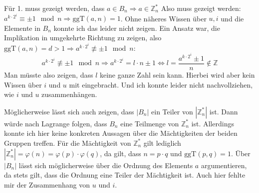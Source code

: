\documentclass[DIN, pagenumber=false, fontsize=11pt, parskip=half]{scrartcl}
\newcommand{\Z}[0]{\mathbb{Z}}
\newcommand{\ggt}{\text{ggT}}
\newcommand{\congTo}[2]{\equiv #1\mod #2}
\begin{document}
    Für 1. muss gezeigt werden, dass $a \in B_n \Rightarrow a \in \Z_n^*$ Also muss gezeigt werden: $a^{k \cdot 2^i} \congTo{\pm 1}{n} \Rightarrow \ggt(a, n) = 1$.
    Ohne näheres Wissen über $u, i$ und die Elemente in $B_n$ konnte ich das leider nicht zeigen. Ein Ansatz war, die Implikation in umgekehrte Richtung zu zeigen,
    also $\ggt(a, n) = d > 1 \Rightarrow a^{k \cdot 2^i} \not\congTo{\pm 1}{n}$:
    \begin{equation*}
        a^{k \cdot 2^i} \not\congTo{\pm 1}{n} \Rightarrow a^{k \cdot 2^i} = l \cdot n \pm 1 \Leftrightarrow l = \frac{a ^{k \cdot 2^i} \pm 1}{n} \notin \Z
    \end{equation*}
    Man müsste also zeigen, dass $l$ keine ganze Zahl sein kann. Hierbei wird aber kein Wissen über $i$ und $u$ mit eingebracht. Und ich konnte leider nicht
    nachvollziehen, wie $i$ und $u$ zusammenhängen.

    Möglicherweise lässt sich auch zeigen, dass $|B_n|$ ein Teiler von $|\Z_n^*|$ ist. Dann würde nach Lagrange folgen, dass $B_n$ eine Teilmenge von $\Z_n^*$
    ist. Allerdings konnte ich hier keine konkreten Aussagen über die Mächtigkeiten der beiden Gruppen treffen. Für die Mächtigkeit von $\Z_n^*$ gilt lediglich
    $|\Z_n^*| = \varphi(n) = \varphi(p) \cdot \varphi(q)$, da gilt, dass $n = p \cdot q$ und $\ggt(p, q) = 1$. Über $|B_n|$ lässt sich möglicherweise über die
    Ordnung des Elements $a$ argumentieren, da stets gilt, dass die Ordnung eine Teiler der Mächtigkeit ist. Auch hier fehlte mir der Zusammenhang von $u$ und $i$.
\end{document}

